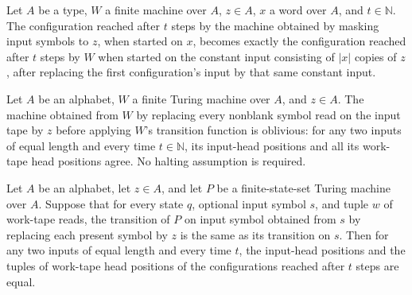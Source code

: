\begin{lemma}
\label{Complexity.maskedClock_lockstep}
\leanok
{}
Let $A$ be a type, $W$ a finite machine over $A$, $z\in A$, $x$ a word over $A$, and
$t\in\mathbb{N}$. The configuration reached after $t$ steps by the machine obtained by
masking input symbols to $z$, when started on $x$, becomes exactly the configuration
reached after $t$ steps by $W$ when started on the constant input consisting of $|x|$
copies of $z$, after replacing the first configuration's input by that same constant
input.
\end{lemma}

\begin{lemma}
\label{Complexity.maskedClock_oblivious}
\leanok
{}
Let $A$ be an alphabet, $W$ a finite Turing machine over $A$, and $z\in A$. The machine
obtained from $W$ by replacing every nonblank symbol read on the input tape by $z$
before applying $W$’s transition function is oblivious: for any two inputs of equal
length and every time $t\in\mathbb N$, its input-head positions and all its work-tape
head positions agree. No halting assumption is required.
\end{lemma}

\begin{lemma}
\label{Complexity.inputInsensitive_oblivious}
\leanok
{}
Let $A$ be an alphabet, let $z\in A$, and let $P$ be a finite-state-set Turing machine
over $A$. Suppose that for every state $q$, optional input symbol $s$, and tuple $w$ of
work-tape reads, the transition of $P$ on input symbol obtained from $s$ by replacing
each present symbol by $z$ is the same as its transition on $s$. Then for any two inputs
of equal length and every time $t$, the input-head positions and the tuples of work-tape
head positions of the configurations reached after $t$ steps are equal.
\end{lemma}


